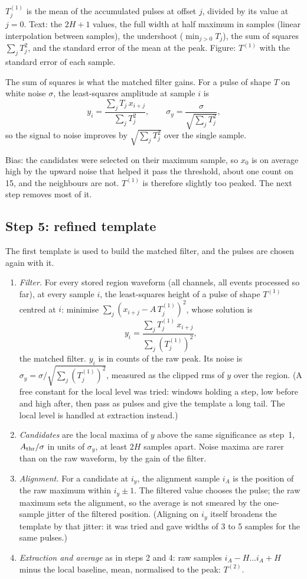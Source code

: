 \documentclass[11pt]{article}
\begin{document}
$T^{(1)}_j$ is the mean of the accumulated pulses at offset $j$, divided
by its value at $j = 0$. Text: the $2H + 1$ values, the full width at
half maximum in samples (linear interpolation between samples), the
undershoot ($\min_{j > 0} T_j$), the sum of squares $\sum_j T_j^2$, and
the standard error of the mean at the peak. Figure: $T^{(1)}$ with the
standard error of each sample.

The sum of squares is what the matched filter gains. For a pulse of
shape $T$ on white noise $\sigma$, the least-squares amplitude at sample
$i$ is
\[
  y_i = \frac{\sum_j T_j\, x_{i+j}}{\sum_j T_j^2},
  \qquad \sigma_y = \frac{\sigma}{\sqrt{\sum_j T_j^2}},
\]
so the signal to noise improves by $\sqrt{\sum_j T_j^2}$ over the single
sample.

Bias: the candidates were selected on their maximum sample, so $x_0$ is
on average high by the upward noise that helped it pass the threshold,
about one count on 15, and the neighbours are not. $T^{(1)}$ is therefore
slightly too peaked. The next step removes most of it.

\subsection{Step 5: refined template}

The first template is used to build the matched filter, and the pulses
are chosen again with it.

\begin{enumerate}
\item \emph{Filter.} For every stored region waveform (all channels, all
  events processed so far), at every sample $i$, the least-squares height
  of a pulse of shape $T^{(1)}$ centred at $i$: minimise $\sum_j (x_{i+j}
  - A\,T^{(1)}_j)^2$, whose solution is
  \[
    y_i = \frac{\sum_j T^{(1)}_j\, x_{i+j}}{\sum_j (T^{(1)}_j)^2},
  \]
  the matched filter. $y_i$ is in counts of the raw peak. Its noise is
  $\sigma_y = \sigma / \sqrt{\sum_j (T^{(1)}_j)^2}$, measured as the
  clipped rms of $y$ over the region. (A free constant for the local
  level was tried: windows holding a step, low before and high after,
  then pass as pulses and give the template a long tail. The local level
  is handled at extraction instead.)
\item \emph{Candidates} are the local maxima of $y$ above the same
  significance as step~1, $A_{\rm thr}/\sigma$ in units of $\sigma_y$, at
  least $2H$ samples apart. Noise maxima are rarer than on the raw
  waveform, by the gain of the filter.
\item \emph{Alignment.} For a candidate at $i_y$, the alignment sample
  $i_A$ is the position of the raw maximum within $i_y \pm 1$. The
  filtered value chooses the pulse; the raw maximum sets the alignment,
  so the average is not smeared by the one-sample jitter of the filtered
  position. (Aligning on $i_y$ itself broadens the template by that
  jitter: it was tried and gave widths of 3 to 5 samples for the same
  pulses.)
\item \emph{Extraction and average} as in steps 2 and 4: raw samples
  $i_A - H \dots i_A + H$ minus the local baseline, mean, normalised to
  the peak: $T^{(2)}$.
\end{enumerate}
\end{document}
